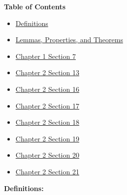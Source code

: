 \documentclass[12pt,letterpaper]{article}
\begin{document}
\RaggedRight
\textbf{Table of Contents}
\begin{itemize}
  \item[] \hyperref[sec:Definitions]{Definitions}
  \item[] \hyperref[sec:Theorems]{Lemmas, Properties, and Theorems}
  \item[] \hyperref[sec:chapter1.7]{Chapter 1 Section 7}
  \item[] \hyperref[sec:chapter2.13]{Chapter 2 Section 13}
  \item[] \hyperref[sec:chapter2.16]{Chapter 2 Section 16}
  \item[] \hyperref[sec:chapter2.17]{Chapter 2 Section 17}
  \item[] \hyperref[sec:chapter2.18]{Chapter 2 Section 18}
  \item[] \hyperref[sec:chapter2.19]{Chapter 2 Section 19}
  \item[] \hyperref[sec:chapter2.20]{Chapter 2 Section 20}
  \item[] \hyperref[sec:chapter2.21]{Chapter 2 Section 21}
\end{itemize}
\noindent \textbf{Definitions:} \label{sec:Definitions}
\end{document}
